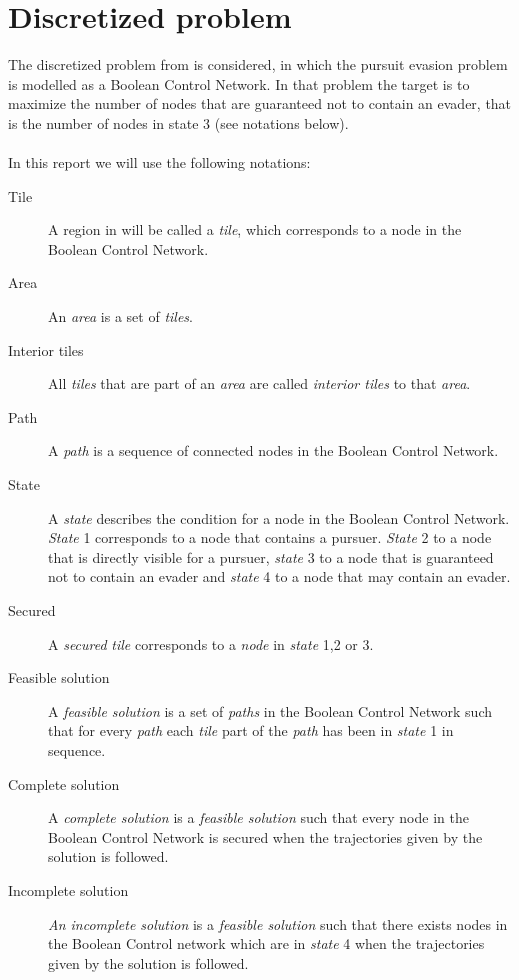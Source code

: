 \section{Discretized problem}\label{discretizedproblem}
The discretized problem from \cite{paper1} is considered, in which the pursuit evasion problem is modelled as a Boolean Control Network. In that problem the target is to maximize the number of nodes that are guaranteed not to contain an evader, that is the number of nodes in state 3 (see notations below).\\
\\
In this report we will use the following notations:
\begin{description}
\item[Tile]A region in \cite{paper1} will be called a \emph{tile}, which corresponds to a node in the Boolean Control Network.
\item[Area]An \emph{area} is a set of \emph{tiles}.
\item[Interior tiles]All \emph{tiles} that are part of an \emph{area} are called \emph{interior tiles} to that \emph{area}.
\item[Path]A \emph{path} is a sequence of connected nodes in the Boolean Control Network.
\item[State]A \emph{state} describes the condition for a node in the Boolean Control Network. \emph{State} 1 corresponds to a node that contains a pursuer. \emph{State} 2 to a node that is directly visible for a pursuer, \emph{state} 3 to a node that is guaranteed not to contain an evader and \emph{state} 4 to a node that may contain an evader.
\item[Secured]A \emph{secured} \emph{tile} corresponds to a \emph{node} in \emph{state} 1,2 or 3.
\item[Feasible solution]A \emph{feasible solution} is a set of \emph{paths} in the Boolean Control Network such that for every \emph{path} each \emph{tile} part of the \emph{path} has been in \emph{state} 1 in sequence.
\item[Complete solution]A \emph{complete solution} is a \emph{feasible solution} such that every node in the Boolean Control Network is secured when the trajectories given by the solution is followed.
\item[Incomplete solution]\emph{An incomplete solution} is a \emph{feasible solution} such that there exists nodes in the Boolean Control network which are in \emph{state} 4 when the trajectories given by the solution is followed.
\end{description}

